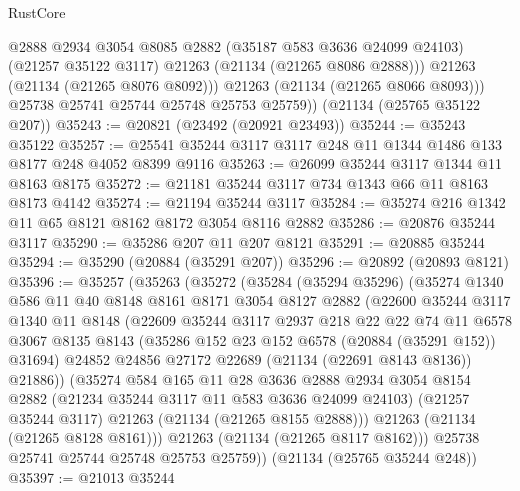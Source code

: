 \begin{lexlean}{RustCore}
\begin{coremodule}
              @2888
              @2934
              @3054
              @8085
              @2882
              (@35187 @583 @3636 @24099 @24103)
              (@21257 @35122 @3117)
              @21263
              (@21134 (@21265 @8086 @2888)))
            @21263
            (@21134 (@21265 @8076 @8092)))
          @21263
          (@21134 (@21265 @8066 @8093)))
        @25738
        @25741
        @25744
        @25748
        @25753
        @25759))
    (@21134 (@25765 @35122 @207))
@35243 := @20821 (@23492 (@20921 @23493))
@35244 := @35243 @35122
@35257 := @25541 @35244 @3117 @3117 @248 @11 @1344 @1486 @133 @8177 @248 @4052 @8399 @9116
@35263 := @26099 @35244 @3117 @1344 @11 @8163 @8175
@35272 := @21181 @35244 @3117 @734 @1343 @66 @11 @8163 @8173 @4142
@35274 := @21194 @35244 @3117
@35284 := @35274 @216 @1342 @11 @65 @8121 @8162 @8172 @3054 @8116 @2882
@35286 := @20876 @35244 @3117
@35290 := @35286 @207 @11 @207 @8121
@35291 := @20885 @35244
@35294 := @35290 (@20884 (@35291 @207))
@35296 := @20892 (@20893 @8121)
@35396 := @35257
    (@35263
      (@35272
        (@35284
          (@35294 @35296)
          (@35274
            @1340
            @586
            @11
            @40
            @8148
            @8161
            @8171
            @3054
            @8127
            @2882
            (@22600
              @35244
              @3117
              @1340
              @11
              @8148
              (@22609
                @35244
                @3117
                @2937
                @218
                @22
                @22
                @74
                @11
                @6578
                @3067
                @8135
                @8143
                (@35286 @152 @23 @152 @6578 (@20884 (@35291 @152)) @31694)
                @24852
                @24856
                @27172
                @22689
                (@21134 (@22691 @8143 @8136))
                @21886))
            (@35274
              @584
              @165
              @11
              @28
              @3636
              @2888
              @2934
              @3054
              @8154
              @2882
              (@21234 @35244 @3117 @11 @583 @3636 @24099 @24103)
              (@21257 @35244 @3117)
              @21263
              (@21134 (@21265 @8155 @2888)))
            @21263
            (@21134 (@21265 @8128 @8161)))
          @21263
          (@21134 (@21265 @8117 @8162)))
        @25738
        @25741
        @25744
        @25748
        @25753
        @25759))
    (@21134 (@25765 @35244 @248))
@35397 := @21013 @35244

\end{coremodule}
\end{lexlean}
